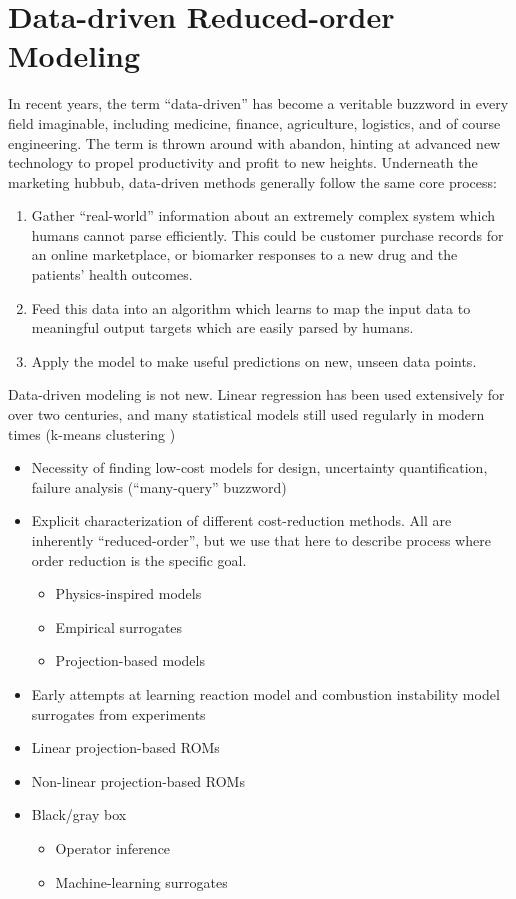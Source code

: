 \section{Data-driven Reduced-order Modeling}

In recent years, the term ``data-driven'' has become a veritable buzzword in every field imaginable, including medicine, finance, agriculture, logistics, and of course engineering. The term is thrown around with abandon, hinting at advanced new technology to propel productivity and profit to new heights. Underneath the marketing hubbub, data-driven methods generally follow the same core process:

\begin{enumerate}
    \item Gather ``real-world'' information about an extremely complex system which humans cannot parse efficiently. This could be customer purchase records for an online marketplace, or biomarker responses to a new drug and the patients' health outcomes.
    \item Feed this data into an algorithm which learns to map the input data to meaningful output targets which are easily parsed by humans.
    \item Apply the model to make useful predictions on new, unseen data points.
\end{enumerate}

Data-driven modeling is not new. Linear regression has been used extensively for over two centuries, and many statistical models still used regularly in modern times (k-means clustering )

\begin{itemize}
    \item Necessity of finding low-cost models for design, uncertainty quantification, failure analysis (``many-query'' buzzword)
    \item Explicit characterization of different cost-reduction methods. All are inherently ``reduced-order'', but we use that here to describe process where order reduction is the specific goal.
    \begin{itemize}
        \item Physics-inspired models
        \item Empirical surrogates
        \item Projection-based models
    \end{itemize}
    \item Early attempts at learning reaction model and combustion instability model surrogates from experiments
    \item Linear projection-based ROMs
    \item Non-linear projection-based ROMs
    \item Black/gray box
    \begin{itemize}
        \item Operator inference
        \item Machine-learning surrogates
    \end{itemize}
\end{itemize}